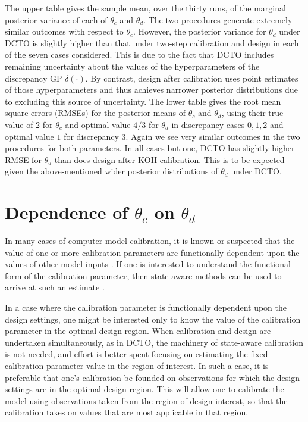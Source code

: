 \documentclass[12pt]{article}
\begin{document}
%
The upper table gives the sample mean, over the thirty runs, of the marginal posterior variance of each of $\theta_c$ and $\theta_d$.
%
The two procedures generate extremely similar outcomes with respect to $\theta_c$.
%
However, the posterior variance for $\theta_d$ under DCTO is slightly higher than that under two-step calibration and design in each of the seven cases considered.
%
This is due to the fact that DCTO includes remaining uncertainty about the values of the hyperparameters of the discrepancy GP $\delta(\cdot)$.
%
By contrast, design after calibration uses point estimates of those hyperparameters and thus achieves narrower posterior distributions due to excluding this source of uncertainty.
%
The lower table gives the root mean square errors (RMSEs) for the posterior means of $\theta_c$ and $\theta_d$, using their true value of 2 for $\theta_c$ and optimal value $4/3$ for $\theta_d$ in discrepancy cases $0,1,2$ and optimal value $1$ for discrepancy 3.
%
Again we see very similar outcomes in the two procedures for both parameters.
%
In all cases but one, DCTO has slightly higher RMSE for $\theta_d$ than does design after KOH calibration.
%
This is to be expected given the above-mentioned wider posterior distributions of $\theta_d$ under DCTO.
%

%
\section{Dependence of $\theta_c$ on $\theta_d$}\label{sec:as}
%
In many cases of computer model calibration, it is known or suspected that the value of one or more calibration parameters are functionally dependent upon the values of other model inputs \citep{Atamturktur2015,Atamturktur2017,Ezzat2018}.
%
If one is interested to understand the functional form of the calibration parameter, then state-aware methods can be used to arrive at such an estimate \citep{Atamturktur2015,Atamturktur2017,Brown2018}.
%

%
In a case where the calibration parameter is functionally dependent upon the design settings, one might be interested only to know the value of the calibration parameter in the optimal design region.
%
When calibration and design are undertaken simultaneously, as in DCTO, the machinery of state-aware calibration is not needed, and effort is better spent focusing on estimating the fixed calibration parameter value in the region of interest.
%
In such a case, it is preferable that one's calibration be founded on observations for which the design settings are in the optimal design region.
%
This will allow one to calibrate the model using observations taken from the region of design interest, so that the calibration takes on values that are most applicable in that region.
%
\end{document}
